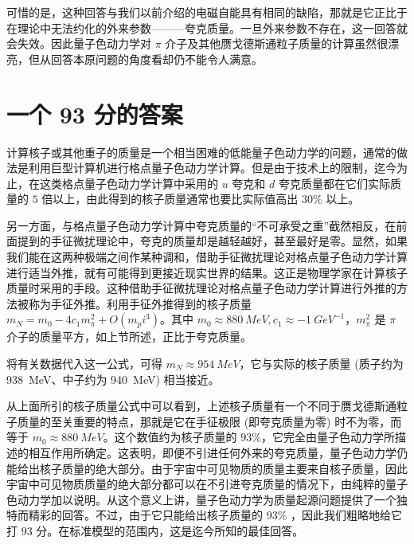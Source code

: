 可惜的是，这种回答与我们以前介绍的电磁自能具有相同的缺陷，那就是它正比于在理论中无法约化的外来参数———夸克质量。一旦外来参数不存在，这一回答就会失效。因此量子色动力学对 $\pi$ 介子及其他赝戈德斯通粒子质量的计算虽然很漂亮，但从回答本原问题的角度看却仍不能令人满意。

\section{一个 93 分的答案}

计算核子或其他重子的质量是一个相当困难的低能量子色动力学的问题，通常的做法是利用巨型计算机进行格点量子色动力学计算。但是由于技术上的限制，迄今为止，在这类格点量子色动力学计算中采用的 $u$ 夸克和 $d$ 夸克质量都在它们实际质量的 $5$ 倍以上，由此得到的核子质量通常也要比实际值高出 $30\%$ 以上。

另一方面，与格点量子色动力学计算中夸克质量的“不可承受之重”截然相反，在前面提到的手征微扰理论中，夸克的质量却是越轻越好，甚至最好是零。显然，如果我们能在这两种极端之间作某种调和，借助手征微扰理论对格点量子色动力学计算进行适当外推，就有可能得到更接近现实世界的结果。这正是物理学家在计算核子质量时采用的手段。这种借助手征微扰理论对格点量子色动力学计算进行外推的方法被称为手征外推。利用手征外推得到的核子质量 $m_N=m_0-4 c_1 m_\pi^2 + O(m_pi^3)$。其中 $m_0 \approx \qty{880}{MeV}, c_1 \approx-\qty{1}{GeV^{-1}}$，$m^2_\pi$ 是 $\pi$ 介子的质量平方，如上节所述，正比于夸克质量。

将有关数据代入这一公式，可得 $m_N\approx\qty{954}{MeV}$，它与实际的核子质量 (质子约为 \qty{938}{MeV}、中子约为 \qty{940}{MeV}) 相当接近。

从上面所引的核子质量公式中可以看到，上述核子质量有一个不同于赝戈德斯通粒子质量的至关重要的特点，那就是它在手征极限 (即夸克质量为零) 时不为零，而等于 $m_0 \approx\qty{880}{MeV}$。这个数值约为核子质量的 $93\%$，它完全由量子色动力学所描述的相互作用所确定。这表明，即便不引进任何外来的夸克质量，量子色动力学仍能给出核子质量的绝大部分。由于宇宙中可见物质的质量主要来自核子质量，因此宇宙中可见物质质量的绝大部分都可以在不引进夸克质量的情况下，由纯粹的量子色动力学加以说明。从这个意义上讲，量子色动力学为质量起源问题提供了一个独特而精彩的回答。不过，由于它只能给出核子质量的 $93\%$ ，因此我们粗略地给它打 $93$ 分。在标准模型的范围内，这是迄今所知的最佳回答。
